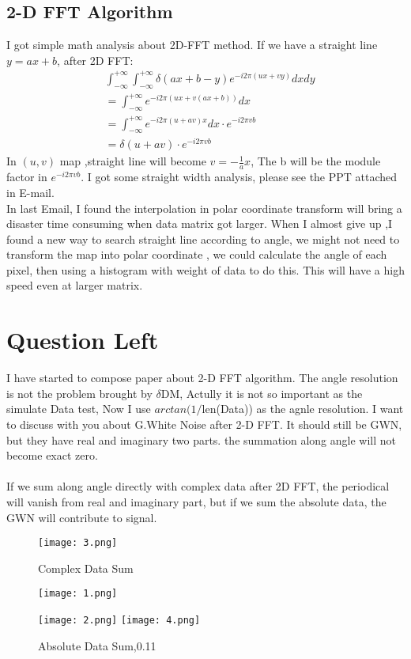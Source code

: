 \documentclass{article}
\begin{document}
\subsection{2-D FFT Algorithm }
I got simple math analysis about 2D-FFT method. If we have a straight line $y=ax +b$, after 2D FFT:
\begin{equation} \begin{aligned}
&\int_{-\infty}^{+\infty}\int_{-\infty}^{+\infty}\delta(ax+b-y)e^{-i2\pi(ux+vy)}dxdy
\\ &= \int_{-\infty}^{+\infty}e^{-i2\pi(ux+v(ax+b))}dx
\\ &= \int_{-\infty}^{+\infty}e^{-i2\pi(u+av)x}dx \cdot e^{-i2\pi vb}
\\ &=\delta(u+av)\cdot e^{-i2\pi vb}
\end{aligned}
\end{equation}
In $(u,v)$ map ,straight line will become $v=-\frac{1}{a} x$, The b will be the module factor in $e^{-i2\pi vb}$.  
I got some straight width analysis, please see the PPT attached in E-mail.\\

In last Email, I found the interpolation in polar coordinate transform will bring a disaster time  consuming when data matrix got larger. When I almost give up ,I found a new way to search straight line according to angle,  we might not need to transform the map into polar coordinate , we could calculate the angle of each pixel, then using a histogram with weight of data to do this. This will have a high speed even at larger matrix. 

\section{Question Left}
I have started to compose paper about 2-D FFT algorithm. The angle resolution is not the problem brought by $\delta $DM, Actully it is not so important as the simulate Data test, Now I use $arctan(1 / $len(Data))  as the agnle resolution.  I want to discuss with you about G.White Noise after 2-D FFT. It should still be GWN, but they have real and imaginary two parts. the summation along angle will not become exact zero. \\
\\If we sum along angle directly with complex data after 2D FFT, the periodical will vanish from real and imaginary part, but if we sum the absolute data, the GWN will contribute to signal. 
\begin{figure}
\center
\texttt{[image: 3.png]}
\caption{Complex Data Sum}
\texttt{[image: 1.png]}
\caption{Absolute Data Sum,0.11}
\texttt{[image: 2.png]}
\texttt{[image: 4.png]}

\end{figure}
\end{document}
